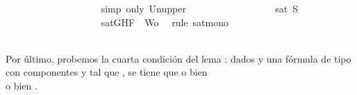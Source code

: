 \begin{isabellebody}
\ \ \ \ \ \ \ \ \ \ \ \ \ \ \ \ \ \ \isamarkupfalse%
\ {\isacharparenleft}simp\ only{\isacharcolon}\ Un{\isacharunderscore}upper{}{\isacharparenright}\isanewline
\ \ \ \ \ \ \ \ \ \ \ \ \ \ \ \ \isamarkupfalse%
\ {\isachardoublequoteopen}sat\ S{\isachardoublequoteclose}\isanewline
\ \ \ \ \ \ \ \ \ \ \ \ \ \ \ \ \ \ \isamarkupfalse%
\ {\isacartoucheopen}sat{\isacharparenleft}{\isacharbraceleft}G{\isacharcomma}H{\isacharcomma}F{\isacharbraceright}\ {\isasymunion}\ Wo{\isacharparenright}{\isacartoucheclose}\ \isamarkupfalse%
\ {\isacharparenleft}rule\ sat{\isacharunderscore}mono{\isacharparenright}\isanewline
\ \ \ \ \ \ \ \ \ \ \ \ \ \ \isamarkupfalse%
\isanewline
\ \ \ \ \ \ \ \ \ \ \ \ \isamarkupfalse%
\isanewline
\ \ \ \ \ \ \ \ \ \ \isamarkupfalse%
\isanewline
\ \ \ \ \ \ \ \ \isamarkupfalse%
\isanewline
\ \ \ \ \ \ \isamarkupfalse%
\isanewline
\ \ \ \ \isamarkupfalse%
\isanewline
\ \ \isamarkupfalse%
\isanewline
{}\isamarkupfalse%
%
\endisatagproof
{\isafoldproof}%
%
\isadelimproof
%
\endisadelimproof
%
\begin{isamarkuptext}%
Por último, probemos la cuarta condición del lema : dados  y  una 
  fórmula de tipo \isa{{\isasymbeta}} con componentes  y  tal que , se tiene que o bien\\  
  o bien . 
  

\end{isamarkuptext}
\end{isabellebody}
